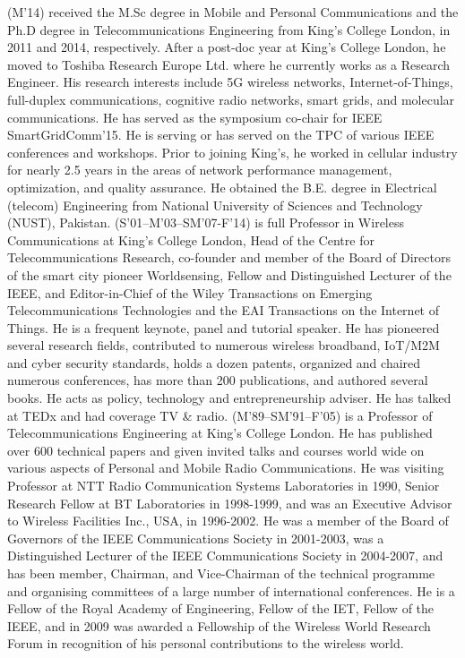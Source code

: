 \documentclass[journal]{IEEEtran}
\renewenvironment{IEEEbiography}[1]
  {\IEEEbiographynophoto{#1}}
  {\endIEEEbiographynophoto}
\begin{document}
\begin{IEEEbiography}{Adnan Aijaz}
(M'14) received the M.Sc degree in Mobile and Personal Communications and the Ph.D degree in Telecommunications Engineering from King’s College London, in 2011 and 2014, respectively. After a post-doc year at King's College London, he moved to Toshiba Research Europe Ltd. where he currently works as a Research Engineer. His research interests include 5G wireless networks, Internet-of-Things, full-duplex communications, cognitive radio networks, smart grids, and molecular communications. He has served as the symposium co-chair for IEEE SmartGridComm'15. He is serving or has served on the TPC of various IEEE conferences and workshops. Prior to joining King's, he worked in cellular industry for nearly 2.5 years in the areas of network performance management, optimization, and quality assurance. He obtained the B.E. degree in Electrical (telecom) Engineering from National University of Sciences and Technology (NUST), Pakistan.
\end{IEEEbiography}
\begin{IEEEbiography}{Mischa Dohler} (S'01–M'03–SM'07-F'14) is full Professor in Wireless Communications at King's College London, Head of the Centre for Telecommunications Research, co-founder and member of the Board of Directors of the smart city pioneer Worldsensing, Fellow and Distinguished Lecturer of the IEEE, and Editor-in-Chief of the Wiley Transactions on Emerging Telecommunications Technologies and the EAI Transactions on the Internet of Things. He is a frequent keynote, panel and tutorial speaker. He has pioneered several research fields, contributed to numerous wireless broadband, IoT/M2M and cyber security standards, holds a dozen patents, organized and chaired numerous conferences, has more than 200 publications, and authored several books. He acts as policy, technology and entrepreneurship adviser. He has talked at TEDx and had coverage TV \& radio.
\end{IEEEbiography}
\begin{IEEEbiography}{Abdol-Hamid Aghvami}
(M'89--SM'91--F'05) is a Professor of Telecommunications Engineering at King's College London. He has published over 600 technical papers and given invited talks and courses world wide on various aspects of Personal and Mobile Radio Communications. He was visiting Professor at NTT Radio Communication Systems Laboratories in 1990, Senior Research Fellow at BT Laboratories in 1998-1999, and was an Executive Advisor to Wireless Facilities Inc., USA, in 1996-2002. He was a member of the Board of Governors of the IEEE Communications Society in 2001-2003, was a Distinguished Lecturer of the IEEE Communications Society in 2004-2007, and has been member, Chairman, and Vice-Chairman of the technical programme and organising committees of a large number of international conferences.  He is a Fellow of the Royal Academy of Engineering, Fellow of the IET, Fellow of the IEEE, and in 2009 was awarded a Fellowship of the Wireless World Research Forum in recognition of his personal contributions to the wireless world. 
\end{IEEEbiography}
\end{document}
